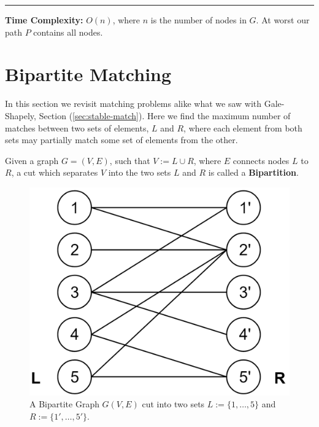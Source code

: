 \begin{Func}

    \vspace{-.5em}
    \begin{algorithm}[H]

        \vspace{.5em}
    \end{algorithm}
    
    \noindent
    \rule{\textwidth}{0.4pt}
    \textbf{Time Complexity:} $O(n)$, where $n$ is the number of nodes in $G$. At worst our path $P$ contains all nodes.
\end{Func}

\newpage
\section{Bipartite Matching}
In this section we revisit matching problems alike what we saw with Gale-Shapely, Section (\ref{sec:stable-match}). Here we find
the maximum number of matches between two sets of elements, $L$ and $R$, where each element from both sets may partially match some 
set of elements from the other.
\begin{Def}

    Given a graph $G=(V, E)$, such that $V:=L\cup R$, where $E$ connects nodes $L$ to $R$,
    a cut which separates $V$ into the two sets $L$ and $R$ is called a \textbf{Bipartition}. 
\end{Def}

\vspace{-.5em}
\begin{figure}[h]
    \centering
    \includegraphics[width=.35\textwidth]{Sections/net/bip.png}
    \caption{A Bipartite Graph $G(V,E)$ cut into two sets $L:=\{1,\dots,5\}$ and $R:=\{1',\dots,5'\}$.}
    \label{fig:bip}
\end{figure}

